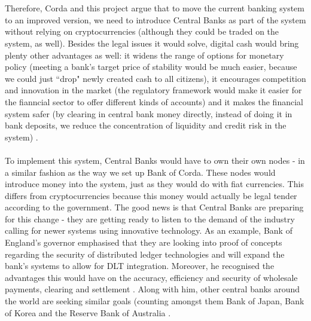 \documentclass[12pt,twoside]{article}
\begin{document}
\\ \\
Therefore, Corda and this project argue that to move the current banking system to an improved version, we need to introduce Central Banks as part of the system without relying on cryptocurrencies (although they could be traded on the system, as well). Besides the legal issues it would solve, digital cash would bring plenty other advantages as well: it widens the range of options for monetary policy (meeting a bank's target price of stability would be much easier, because we could just ``drop" newly created cash to all citizens), it encourages competition and innovation in the market (the regulatory framework would make it easier for the fianncial sector to offer different kinds of accounts) and it makes the financial system safer (by clearing in central bank money directly, instead of doing it in bank deposits, we reduce the concentration of liquidity and credit risk in the system) \cite{digcash}.
\\ \\
To implement this system, Central Banks would have to own their own nodes - in a similar fashion as the way we set up Bank of Corda. These nodes would introduce money into the system, just as they would do with fiat currencies. This differs from cryptocurrencies because this money would actually be legal tender according to the government. The good news is that Central Banks are preparing for this change - they are getting ready to listen to the demand of the industry calling for newer systems using innovative technology. As an example, Bank of England's governor emphasised that they are looking into proof of concepts regarding the security of distributed ledger technologies and will expand the bank's systems to allow for DLT integration. Moreover, he recognised the advantages this would have on the accuracy, efficiency and security of wholesale payments, clearing and settlement \cite{markc}. Along with him, other central banks around the world are seeking similar goals (counting amongst them Bank of Japan, Bank of Korea and the Reserve Bank of Australia \cite{centralbanks}. 
\\
\begin{comment}
\begin{figure}[!htb]
\centering
\texttt{[image: issuers.png]}
\caption{Issuing cash and assets in our system}
\centering
\label{fig:issuers}
\end{figure}
\end{comment}
\\
\end{document}
